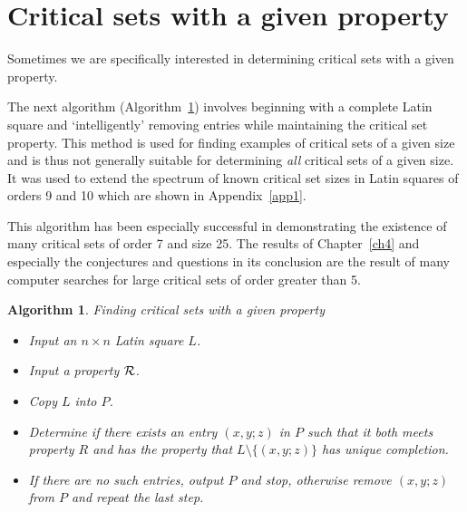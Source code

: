 \documentclass[12pt]{report}
\newtheorem{algorithm}{Algorithm}
\begin{document}
\section{Critical sets with a given property}

Sometimes we are specifically interested in determining critical sets
with a given property.

The next algorithm (Algorithm~\ref{337}) involves beginning with a complete Latin square 
and `intelligently' removing entries
while maintaining the critical set property.  This method is used
for finding examples of critical sets of a given size and is thus not generally
suitable for determining {\em all} critical sets of a given size.  It was used
to extend the spectrum of known critical set sizes in Latin squares of orders
9 and 10 which are shown in Appendix~\ref{app1}.

This algorithm has been especially successful in
demonstrating the existence of many critical sets of order 7 and size 25.
The results of Chapter~\ref{ch4} and especially the conjectures and questions
in its conclusion are the result of many computer searches for large
critical sets of order greater than 5.


\begin{algorithm}{Finding critical sets with a given property}
\label{337}
\begin{itemize}
\item Input an $n \times n$ Latin square $L$.
\item Input a property $\cal{R}$.
\item Copy $L$ into $P$.
\item Determine if there exists an entry $(x,y;z)$ in $P$ such that it both meets property $R$ and has the property that $L \setminus \{(x,y;z)\}$ has unique completion.
\item If there are no such entries, output $P$ and stop, otherwise remove $(x,y;z)$ from $P$ and repeat the last step.
\end{itemize}
\end{algorithm}
\end{document}
